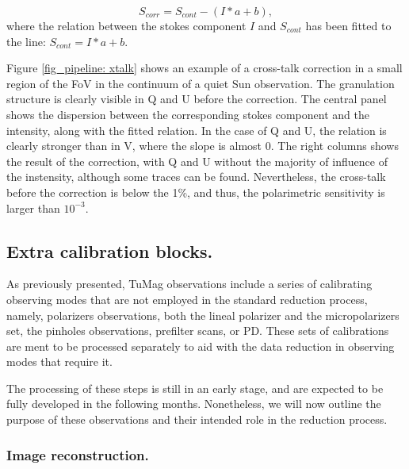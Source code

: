 \begin{equation}
  S_{corr} = S_{cont} - (I * a + b),
\end{equation}
where the relation between the stokes component $I$ and $S_{cont}$ has been fitted to the line: $S_{cont} =  I * a + b$.

Figure \ref{fig_pipeline: xtalk} shows an example of a cross-talk correction in a small region of the FoV in the continuum of a quiet Sun observation. The granulation structure is clearly visible in Q and U before the correction. The central panel shows the dispersion between the corresponding  stokes component and the intensity, along with the fitted relation. In the case of Q and U, the relation is clearly stronger than in V, where the slope is almost 0. The right columns shows the result of the correction, with Q and U without the majority of influence of the instensity, although some traces can be found. Nevertheless, the cross-talk before the correction is below the 1\%, and thus, the polarimetric sensitivity is larger than $10^{-3}$.
\subsection{Extra calibration blocks.}

As previously presented, TuMag observations include a series of calibrating observing modes that are not employed in the standard reduction process, namely, polarizers observations, both the lineal polarizer and the micropolarizers set, the pinholes observations, prefilter scans, or PD. These sets of calibrations are ment to be processed separately to aid with the data reduction in observing modes that require it.

The processing of these steps is still in an early stage, and are expected to be fully developed in the following months. Nonetheless, we will now outline the purpose of these observations and their intended role in the reduction process.
\subsubsection{Image reconstruction.}

